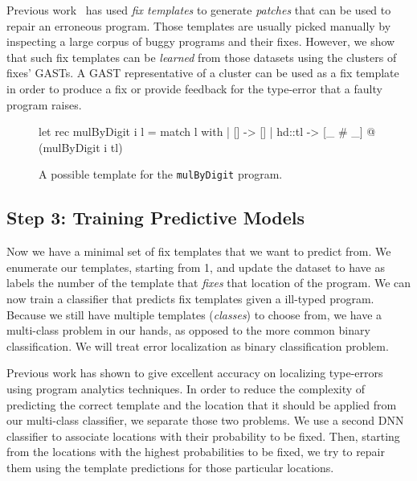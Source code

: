 Previous work~\citep[][]{martinez2013automatically,
martinez2015mining} has used \emph{fix templates} to generate \emph{patches}
that can be used to repair an erroneous program. Those templates are usually
picked manually by inspecting a large corpus of buggy programs and their fixes.
However, we show that such fix templates can be \emph{learned} from those
datasets using the clusters of fixes' GASTs. A GAST representative of a cluster
can be used as a fix template in order to produce a fix or provide feedback for
the type-error that a faulty program raises.


\begin{figure}[ht]
\begin{ecode}
let rec mulByDigit i l =
  match l with
  | []     -> []
  | hd::tl -> [_ # _] @ (mulByDigit i tl)
\end{ecode}
\caption{A possible template for the \texttt{mulByDigit} program.}
\label{fig:suggestion}
\end{figure}



\subsection{Step 3: Training Predictive Models}
\label{subsec:step3}

Now we have a minimal set of fix templates that we want to predict from. We
enumerate our templates, starting from 1, and update the dataset to have as
labels the number of the template that \emph{fixes} that location of the
program. We can now train a classifier that predicts fix templates given a
ill-typed program. Because we still have multiple templates (\emph{classes}) to
choose from, we have a multi-class problem in our hands, as opposed to the more
common binary classification. We will treat error localization as binary
classification problem.

 Previous work has shown to give excellent accuracy
on localizing type-errors using program analytics techniques. In order to reduce
the complexity of predicting the correct template and the location that it
should be applied from our multi-class classifier, we separate those two
problems. We use a second DNN classifier to associate locations with their
probability to be fixed. Then, starting from the locations with the highest
probabilities to be fixed, we try to repair them using the template predictions
for those particular locations.

